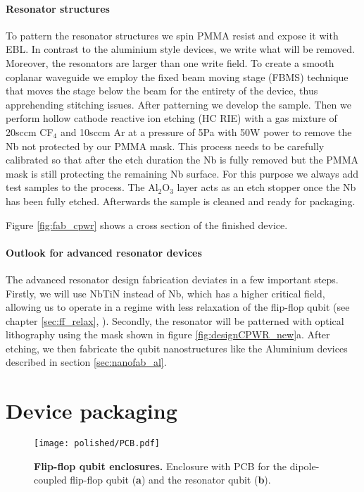 \paragraph*{Resonator structures}
To pattern the resonator structures we spin PMMA resist and expose it with EBL. In contrast to the aluminium style devices, we write what will be removed. Moreover, the resonators are larger than one write field. To create a smooth coplanar waveguide we employ the fixed beam moving stage (FBMS) technique that moves the stage below the beam for the entirety of the device, thus apprehending stitching issues. After patterning we develop the sample. Then we perform hollow cathode reactive ion etching (HC RIE) with a gas mixture of 20sccm CF$_4$ and 10sccm Ar at a pressure of 5Pa with 50W power to remove the Nb not protected by our PMMA mask. This process needs to be carefully calibrated so that after the etch duration the Nb is fully removed but the PMMA mask is still protecting the remaining Nb surface. For this purpose we always add test samples to the process. The Al$_2$O$_3$ layer acts as an etch stopper once the Nb has been fully etched. Afterwards the sample is cleaned and ready for packaging. 

Figure \ref{fig:fab_cpwr} shows a cross section of the finished device. 

\paragraph*{Outlook for advanced resonator devices}
The advanced resonator design fabrication deviates in a few important steps. Firstly, we will use NbTiN instead of Nb, which has a higher critical field, allowing us to operate in a regime with less relaxation of the flip-flop qubit (see chapter \ref{sec:ff_relax}, \cite{Boross2016}). Secondly, the resonator will be patterned with optical lithography using the mask shown in figure \ref{fig:designCPWR_new}a. After etching, we then fabricate the qubit nanostructures like the Aluminium devices described in section \ref{sec:nanofab_al}. 


\section{Device packaging} \label{sec:packaging}

\begin{figure}
	\centering
	\texttt{[image: polished/PCB.pdf]}
	\caption[Flip-flop qubit enclosures]{\textbf{Flip-flop qubit enclosures. } Enclosure with PCB for the dipole-coupled flip-flop qubit (\textbf{a}) and the resonator qubit (\textbf{b}).}
	\label{fig:pcb}
\end{figure}

